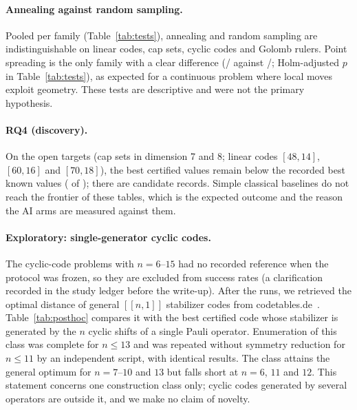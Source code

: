 \documentclass[11pt]{article}
\begin{document}
\paragraph{Annealing against random sampling.} Pooled per family
(Table~\ref{tab:tests}), annealing and random sampling are indistinguishable on linear
codes, cap sets, cyclic codes and Golomb rulers. Point spreading is the only family with a
clear difference (\SpreadAnnealSuccess{}/\SpreadAnnealRuns{} against
\SpreadRandomSuccess{}/\SpreadRandomRuns{}; Holm-adjusted $p$ in Table~\ref{tab:tests}),
as expected for a continuous problem where local moves exploit geometry. These tests are
descriptive and were not the primary hypothesis.

\paragraph{RQ4 (discovery).} On the \NumOpenTargets{} open targets (cap sets in dimension 7
and 8; linear codes $[48,14]$, $[60,16]$ and $[70,18]$), the best certified values remain
below the recorded best known values (\OpenBelow{} of \NumOpenTargets{}); there are
\NumCandidateNew{} candidate records. Simple classical baselines do not reach the frontier
of these tables, which is the expected outcome and the reason the AI arms are measured
against them.

\paragraph{Exploratory: single-generator cyclic codes.} The \NumUnscored{} cyclic-code
problems with $n = 6$--$15$ had no recorded reference when the protocol was frozen, so
they are excluded from success rates (a clarification recorded in the study ledger before
the write-up). After the runs, we retrieved the optimal distance of general $[[n,1]]$
stabilizer codes from codetables.de~\citep{codetables}. Table~\ref{tab:posthoc} compares it
with the best certified code whose stabilizer is generated by the $n$ cyclic shifts of a
single Pauli operator. Enumeration of this class was complete for $n \le 13$ and was
repeated without symmetry reduction for $n \le 11$ by an independent script, with identical
results. The class attains the general optimum for $n = 7$--$10$ and $13$ but falls short at
$n = 6$, $11$ and $12$. This statement concerns one construction class only; cyclic codes
generated by several operators are outside it, and we make no claim of novelty.

\begin{table}[h]\centering\small

\caption{Exploratory. Best certified distance among $[[n,1]]$ codes generated by the cyclic
shifts of one Pauli operator, against the optimum over all stabilizer codes
(codetables.de, retrieved 2026-11-01, after the study ran).}\label{tab:posthoc}
\end{table}
\end{document}
